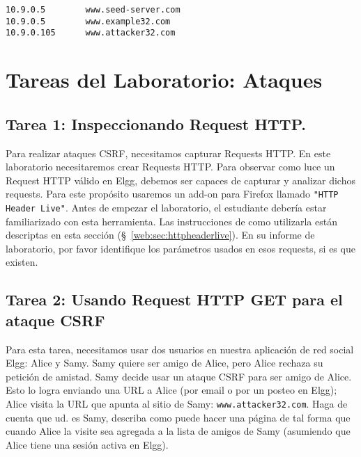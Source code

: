 \begin{lstlisting}
10.9.0.5        www.seed-server.com
10.9.0.5        www.example32.com
10.9.0.105      www.attacker32.com
\end{lstlisting}


\vspace{-0.1in}



\vspace{-0.1in}



\section{Tareas del Laboratorio: Ataques}


\subsection{Tarea 1: Inspeccionando Request HTTP.}

Para realizar ataques CSRF, necesitamos capturar Requests HTTP.
En este laboratorio necesitaremos crear Requests HTTP. 
Para observar como luce un Request HTTP válido en Elgg, debemos ser capaces de capturar y analizar dichos requests.
Para este propósito usaremos un add-on para Firefox llamado \texttt{"HTTP Header Live"}. Antes de empezar el laboratorio, el estudiante debería estar familiarizado con esta herramienta.
Las instrucciones de como utilizarla están descriptas en esta sección (\S~\ref{web:sec:httpheaderlive}). En su informe de laboratorio, por favor identifique los parámetros usados en esos requests, si es que existen.


\subsection{Tarea 2: Usando Request HTTP GET para el ataque CSRF}

Para esta tarea, necesitamos usar dos usuarios en nuestra aplicación de red social Elgg: Alice y Samy. Samy quiere ser amigo de Alice, pero Alice rechaza su petición de amistad. Samy decide usar un ataque CSRF para ser amigo de Alice. Esto lo logra enviando una URL a Alice (por email o por un posteo en Elgg); Alice visita la URL que apunta al sitio de Samy: \texttt{www.attacker32.com}.
Haga de cuenta que ud. es Samy, describa como puede hacer una página de tal forma que cuando Alice la visite sea agregada a la lista de amigos de Samy (asumiendo que Alice tiene una sesión activa en Elgg).



